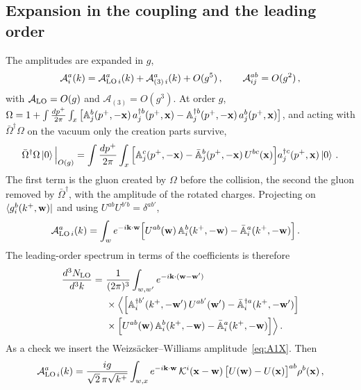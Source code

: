 \subsection{Expansion in the coupling and the leading order}\label{sec:LO}

The amplitudes are expanded in $g$,
\begin{align}\label{eq:ampexp}
\mathcal A^a_i(k)=\mathcal A^{a}_{{\rm LO}\,i}(k)+\mathcal A^a_{(3)\,i}(k)+O(g^5)\,,\qquad \mathcal A^{ab}_{ij}=O(g^2)\,,
\end{align}
with $\mathcal A_{\rm LO}=O(g)$ and $\mathcal A_{(3)}=O(g^3)$. At order $g$, $\Omega=1+\int\frac{dp^+}{2\pi}\int_x\big[\mathbb{A}^b_j(p^+,-\mathbf{x})\,a^{\dagger b}_j(p^+,\mathbf{x})-\mathbb{A}^{\dagger b}_j(p^+,-\mathbf{x})\,a^b_j(p^+,\mathbf{x})\big]$, and acting with $\bar\Omega^\dagger\Omega$ on the vacuum only the creation parts survive,
\begin{align}\label{eq:LOstate}
\bar\Omega^\dagger\Omega\ket0\Big|_{O(g)}=\int\frac{dp^+}{2\pi}\int_x\Big[\mathbb{A}^c_j(p^+,-\mathbf{x})-\bar{\mathbb{A}}^b_j(p^+,-\mathbf{x})\,U^{bc}(\mathbf{x})\Big]a^{\dagger c}_j(p^+,\mathbf{x})\ket0\,.
\end{align}
The first term is the gluon created by $\Omega$ before the collision, the second the gluon removed by $\bar\Omega^\dagger$, with the amplitude of the rotated charges. Projecting on $\bra{g^b_i(k^+,\mathbf{w})}$ and using $U^{ab}U^{b'b}=\delta^{ab'}$,
\begin{align}\label{eq:ALO}
\mathcal A^{a}_{{\rm LO}\,i}(k)&=\int_{w}e^{-i\mathbf{k}\cdot\mathbf{w}}\Big[U^{ab}(\mathbf{w})\,\mathbb{A}^b_i(k^+,-\mathbf{w})-\bar{\mathbb{A}}^a_i(k^+,-\mathbf{w})\Big]\,.
\end{align}
The leading-order spectrum in terms of the coefficients is therefore
\begin{align}\label{eq:LOcoeff}
\frac{d^3N_{\rm LO}}{d^3k}=\ &\frac{1}{(2\pi)^3}\int_{w,w'}e^{-i\mathbf{k}\cdot(\mathbf{w}-\mathbf{w}')}\notag\\&\times\Big\langle\Big[\mathbb{A}^{\dagger b'}_i(k^+,-\mathbf{w}')\,U^{ab'}(\mathbf{w}')-\bar{\mathbb{A}}^{\dagger a}_i(k^+,-\mathbf{w}')\Big]\notag\\
&\times\Big[U^{ab}(\mathbf{w})\,\mathbb{A}^b_i(k^+,-\mathbf{w})-\bar{\mathbb{A}}^a_i(k^+,-\mathbf{w})\Big]\Big\rangle\,.
\end{align}
As a check we insert the Weizs\"acker--Williams amplitude~\eqref{eq:A1X}. Then
\begin{align}\label{eq:ALOexpl}
\mathcal A^{a}_{{\rm LO}\,i}(k)=\frac{ig}{\sqrt2\,\pi\sqrt{k^+}}\int_{w,x}e^{-i\mathbf{k}\cdot\mathbf{w}}\,\mathcal{K}^i(\mathbf{x}-\mathbf{w})\,\big[U(\mathbf{w})-U(\mathbf{x})\big]^{ab}\rho^b(\mathbf{x})\,,
\end{align}
